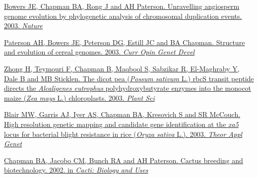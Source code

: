 \documentclass[10pt]{article}
\makeatletter
\newlength{\bibhang}
\newlength{\bibsep}
 {\@listi \global\bibsep\itemsep \global\advance\bibsep by\parsep}
\newenvironment{bibsection}%
        {\vspace{-\baselineskip}\begin{list}{}{%
       \setlength{\leftmargin}{\bibhang}%
       \setlength{\itemindent}{-\leftmargin}%
       \setlength{\itemsep}{\bibsep}%
       \setlength{\parsep}{\z@}%
        \setlength{\partopsep}{0pt}%
        \setlength{\topsep}{0pt}}}
        {\end{list}\vspace{-.6\baselineskip}}
\renewcommand{\section}[2]%
        {\pagebreak[2]\vspace{1.3\baselineskip}%
         \phantomsection\addcontentsline{toc}{section}{#1}%
         \hspace{0in}%
         \marginpar{
         \raggedright \scshape #1}#2}
\newenvironment{outerlist}[1][\enskip\textbullet]%
        {\begin{itemize}[#1]}{\end{itemize}%
         \vspace{-.6\baselineskip}}
\providecommand*\email[1]{\href{mailto:#1}{#1}}
\makeatother
\begin{document}
\begin{bibsection}
  \item \href{http://www.nature.com/nature/journal/v422/n6930/full/nature01521.html}
    {Bowers JE, Chapman BA, Rong J and AH Paterson. 
    Unravelling angiosperm genome evolution by phylogenetic analysis of
    chromosomal duplication events. 2003. \textit{Nature}}

  \item \href{http://linkinghub.elsevier.com/retrieve/pii/S0959437X03001400}
    {Paterson AH, Bowers JE, Peterson DG, Estill JC and BA Chapman.
    Structure and evolution of cereal genomes. 2003. \textit{Curr Opin Genet Devel}}

  \item \href{http://linkinghub.elsevier.com/retrieve/pii/S016894520300061X}
    {Zhong H, Teymouri F, Chapman B, Maqbool S, Sabzikar R, El-Maghraby Y, 
    Dale B and MB Sticklen.
    The dicot pea (\textit{Possum sativum} L.) rbcS transit peptide directs the
    \textit{Alcaligenes eutrophus} polyhydroxybutyrate enzymes into
    the monocot maize (\textit{Zea mays} L.) chloroplasts. 2003.
    \textit{Plant Sci}}

  \item \href{http://dx.doi.org/10.1007/s00122-003-1231-2}
    {Blair MW, Garris AJ, Iyer AS, Chapman BA, Kresovich S and SR McCouch.
    High resolution genetic mapping and candidate gene identification 
    at the \textit{xa5} locus for bacterial blight 
    resistance in rice (\textit{Oryza sativa} L.). 2003. \textit{Theor Appl Genet}}
  
  \item \href{http://www.ucpress.edu/book.php?isbn=9780520231573}
    {Chapman BA, Jacobo CM, Bunch RA and AH Paterson. 
    Cactus breeding and biotechnology. 2002. 
    in \textit{Cacti: Biology and Uses}}
\end{bibsection}

\end{document}

